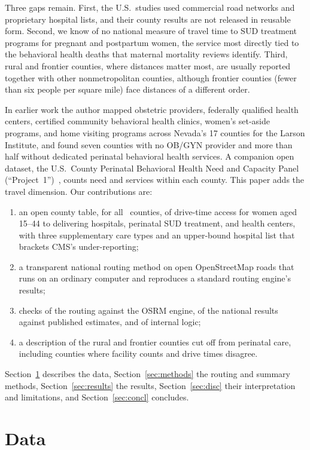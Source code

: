 \documentclass[10pt,twocolumn,letterpaper]{article}
\begin{document}
Three gaps remain. First, the U.S.\ studies used commercial road networks and proprietary hospital lists, and their county results are not released in reusable form. Second, we know of no national measure of travel time to SUD treatment programs for pregnant and postpartum women, the service most directly tied to the behavioral health deaths that maternal mortality reviews identify. Third, rural and frontier counties, where distances matter most, are usually reported together with other nonmetropolitan counties, although frontier counties (fewer than six people per square mile) face distances of a different order.

In earlier work the author mapped obstetric providers, federally qualified health centers, certified community behavioral health clinics, women's set-aside programs, and home visiting programs across Nevada's 17 counties for the Larson Institute, and found seven counties with no OB/GYN provider and more than half without dedicated perinatal behavioral health services. A companion open dataset, the U.S.\ County Perinatal Behavioral Health Need and Capacity Panel (``Project~1'')~\cite{emesobum_p1}, counts need and services within each county. This paper adds the travel dimension. Our contributions are:
\begin{enumerate}
\item an open county table, for all \NCounties\ counties, of drive-time access for women aged 15--44 to delivering hospitals, perinatal SUD treatment, and health centers, with three supplementary care types and an upper-bound hospital list that brackets CMS's under-reporting;
\item a transparent national routing method on open OpenStreetMap roads that runs on an ordinary computer and reproduces a standard routing engine's results;
\item checks of the routing against the OSRM engine, of the national results against published estimates, and of internal logic;
\item a description of the rural and frontier counties cut off from perinatal care, including counties where facility counts and drive times disagree.
\end{enumerate}
Section~\ref{sec:data} describes the data, Section~\ref{sec:methods} the routing and summary methods, Section~\ref{sec:results} the results, Section~\ref{sec:disc} their interpretation and limitations, and Section~\ref{sec:concl} concludes.

\section{Data}\label{sec:data}
\end{document}
